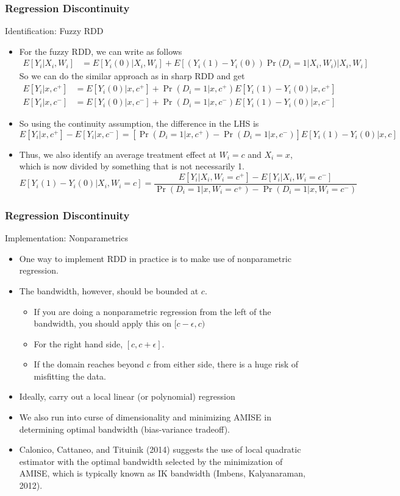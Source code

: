 \documentclass{beamer}
\begin{document}
\begin{frame}
\frametitle{Regression Discontinuity}
Identification: Fuzzy RDD
\begin{itemize}
\item For the fuzzy RDD, we can write as follows 
\footnotesize{\begin{align*}
E[Y_i|X_i, W_i]&=E[Y_i(0)|X_i, W_i]+E[(Y_i(1)-Y_i(0))\Pr(D_i=1|X_i, W_i)|X_i, W_i]
\end{align*}}\normalsize
So we can do the similar approach as in sharp RDD and get 
\footnotesize{\begin{align*}
E[Y_i|x, c^+]&=E[Y_i(0)|x, c^+]+\Pr(D_i=1|x,c^+)E[Y_i(1)-Y_i(0)|x, c^+]\\
E[Y_i|x, c^-]&=E[Y_i(0)|x, c^-]+\Pr(D_i=1|x, c^-)E[Y_i(1)-Y_i(0)|x, c^-]
\end{align*}}\normalsize
\item So using the continuity assumption, the difference in the LHS is
\footnotesize{\[
E[Y_i|x, c^+]-E[Y_i|x, c^-]=[\Pr(D_i=1|x, c^+)-\Pr(D_i=1|x, c^-)]E[Y_i(1)-Y_i(0)|x, c]
\]}\normalsize
\item Thus, we also identify an average treatment effect at $W_i=c$ and $X_i=x$, which is now divided by something that is not necessarily 1. 
\footnotesize{\[
E[Y_i(1)-Y_i(0)|X_i, W_i=c]=\frac{E[Y_i|X_i, W_i=c^+]-E[Y_i|X_i, W_i=c^-]}{\Pr(D_i=1|x, W_i=c^+)-\Pr(D_i=1|x, W_i=c^-)}
\]}\normalsize
\end{itemize}
\end{frame}

\begin{frame}
\frametitle{Regression Discontinuity}
Implementation: Nonparametrics
\begin{itemize}
\item One way to implement RDD in practice is to make use of nonparametric regression. 
\item The bandwidth, however, should be bounded at $c$.
\begin{itemize}
\item If you are doing a nonparametric regression from the left of the bandwidth, you should apply this on $[c-\epsilon, c)$
\item For the right hand side, $[c, c+\epsilon]$. 
\item If the domain reaches beyond $c$ from either side, there is a huge risk of misfitting the data.
\end{itemize}
\item Ideally, carry out a local linear (or polynomial) regression
\item We also run into curse of dimensionality and minimizing AMISE in determining optimal bandwidth (bias-variance tradeoff).
\item Calonico, Cattaneo, and Tituinik (2014) suggests the use of local quadratic estimator with the optimal bandwidth selected by the minimization of AMISE, which is typically known as IK bandwidth (Imbens, Kalyanaraman, 2012).
\end{itemize}
\end{frame}
\end{document}
